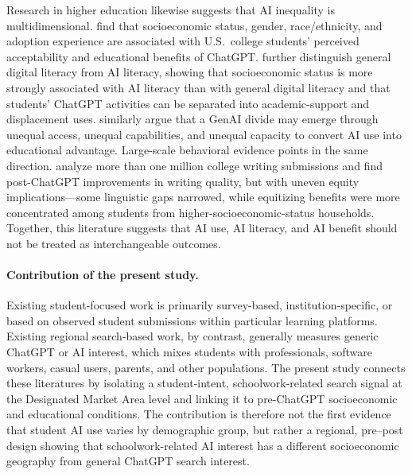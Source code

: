 \documentclass[11pt]{article}
\begin{document}
Research in higher education likewise suggests that AI inequality is multidimensional. \citet{zhang2025} find that socioeconomic status, gender, race/ethnicity, and adoption experience are associated with U.S.\ college students' perceived acceptability and educational benefits of ChatGPT. \citet{zhang2026} further distinguish general digital literacy from AI literacy, showing that socioeconomic status is more strongly associated with AI literacy than with general digital literacy and that students' ChatGPT activities can be separated into academic-support and displacement uses. \citet{beckman2025} similarly argue that a GenAI divide may emerge through unequal access, unequal capabilities, and unequal capacity to convert AI use into educational advantage. Large-scale behavioral evidence points in the same direction. \citet{yu2024} analyze more than one million college writing submissions and find post-ChatGPT improvements in writing quality, but with uneven equity implications---some linguistic gaps narrowed, while equitizing benefits were more concentrated among students from higher-socioeconomic-status households. Together, this literature suggests that AI use, AI literacy, and AI benefit should not be treated as interchangeable outcomes.

\paragraph{Contribution of the present study.}
Existing student-focused work is primarily survey-based, institution-specific, or based on observed student submissions within particular learning platforms. Existing regional search-based work, by contrast, generally measures generic ChatGPT or AI interest, which mixes students with professionals, software workers, casual users, parents, and other populations. The present study connects these literatures by isolating a student-intent, schoolwork-related search signal at the Designated Market Area level and linking it to pre-ChatGPT socioeconomic and educational conditions. The contribution is therefore not the first evidence that student AI use varies by demographic group, but rather a regional, pre--post design showing that schoolwork-related AI interest has a different socioeconomic geography from general ChatGPT search interest.
\end{document}
